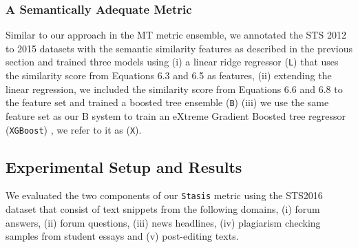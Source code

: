 \subsubsection{A Semantically Adequate Metric}

Similar to our approach in the MT metric ensemble, we annotated the STS 2012 to 2015 datasets with the semantic similarity features as described in the previous section and trained three models using (i) a linear ridge regressor ({\tt L}) that uses the similarity score from Equations 6.3 and 6.5 as features, (ii) extending the linear regression, we included the similarity score from Equations 6.6 and 6.8 to the feature set and trained a boosted tree ensemble \citep{friedman2001greedy} ({\tt B}) (iii) we use the same feature set as our B system to train an eXtreme Gradient Boosted tree regressor ({\tt XGBoost}) \citep{chen2015xgboost,chenxgboost}, we refer to it as ({\tt X}).

\subsection{Experimental Setup and Results}

We evaluated the two components of our {\tt Stasis} metric using the STS2016 dataset that consist of text snippets from the following domains, (i) forum answers, (ii) forum questions, (iii) news headlines, (iv) plagiarism checking samples from student essays and (v) post-editing texts.

